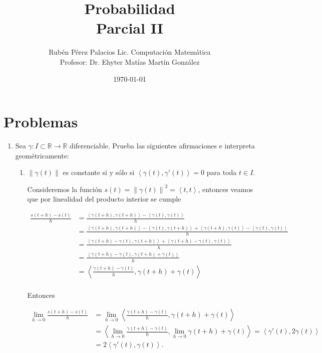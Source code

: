 \documentclass[letterpaper]{article}
\title{Probabilidad \\Parcial II}
\author{Rubén Pérez Palacios Lic. Computación Matemática\\Profesor: Dr. Ehyter Matías Martín González}
\date{\today}
\theoremstyle{definition}
\theoremstyle{lemathm}
\theoremstyle{lemathm}
\theoremstyle{lemademthm}
\newcommand{\limh}{\lim_{h\to0}}
\newcommand{\inprod}[1]{\left\langle #1 \right\rangle }
\newcommand{\norm}[1]{\left\lVert#1\right\rVert}
\newcommand{\R}{\mathbb{R}}
\newcommand{\1}{\mathbbm{1}}
\begin{document}
	\maketitle
    
    \section*{Problemas}

	\begin{enumerate}
		
		\item Sea $\gamma : I \subset \R \to \R$ diferenciable. Prueba las siguientes afirmaciones e interpreta geométricamente:
		
		\begin{enumerate}
			\item $\norm{\gamma(t)}$ es constante si y sólo si $\inprod{\gamma(t),\gamma'(t)} = 0$ para toda $t\in I$.
			
			Consideremos la función $s(t) = \norm{\gamma(t)}^2 = \inprod{t,t}$, entonces veamos que por linealidad del producto interior se cumple

			\begin{align*}
				\frac{s(t+h)-s(t)}{h} &= \frac{\inprod{\gamma(t+h),\gamma(t+h)} - \inprod{\gamma(t),\gamma(t)}}{h}\\
				&= \frac{\inprod{\gamma(t+h),\gamma(t+h)} - \inprod{\gamma(t),\gamma(t+h)} + \inprod{\gamma(t+h),\gamma(t)} - \inprod{\gamma(t),\gamma(t)}}{h}\\
				&= \frac{\inprod{\gamma(t+h) - \gamma(t),\gamma(t+h)} + \inprod{\gamma(t+h) - \gamma(t),\gamma(t)}}{h}\\
				&= \frac{\inprod{\gamma(t+h) - \gamma(t),\gamma(t+h) + \gamma(t)}}{h}\\
				&= \inprod{\frac{\gamma(t+h) - \gamma(t)}{h},\gamma(t+h) + \gamma(t)}\\
			\end{align*}

			Entonces

			\begin{align*}
				\limh \frac{s(t+h)-s(t)}{h} &= \limh \inprod{\frac{\gamma(t+h) - \gamma(t)}{h},\gamma(t+h) + \gamma(t)}\\
				&= \inprod{\limh \frac{\gamma(t+h) - \gamma(t)}{h}, \limh \gamma(t+h) + \gamma(t)} = \inprod{\gamma'(t), 2\gamma(t)}\\
				&= 2\inprod{\gamma'(t), \gamma(t)}.
			\end{align*}


\end{enumerate}
\end{enumerate}
\end{document}
